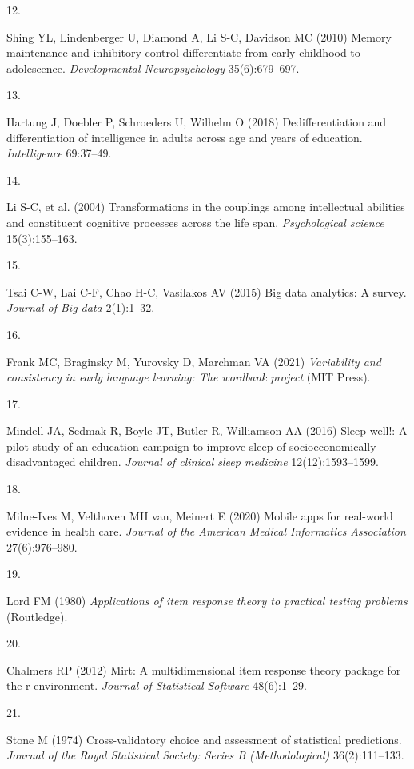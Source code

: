 \documentclass[man]{apa7}
\newlength{\csllabelwidth}
\newcommand{\CSLLeftMargin}[1]{\parbox[t]{\csllabelwidth}{#1}}
\begin{document}
\leavevmode\hypertarget{ref-shing2010memory}{}%
\CSLLeftMargin{12. }Shing YL, Lindenberger U, Diamond A, Li S-C, Davidson MC
(2010) Memory maintenance and inhibitory control differentiate from
early childhood to adolescence. \emph{Developmental Neuropsychology}
35(6):679--697.

\leavevmode\hypertarget{ref-hartung2018dedifferentiation}{}%
\CSLLeftMargin{13. }Hartung J, Doebler P, Schroeders U, Wilhelm O (2018)
Dedifferentiation and differentiation of intelligence in adults across
age and years of education. \emph{Intelligence} 69:37--49.

\leavevmode\hypertarget{ref-li2004transformations}{}%
\CSLLeftMargin{14. }Li S-C, et al. (2004) Transformations in the couplings
among intellectual abilities and constituent cognitive processes across
the life span. \emph{Psychological science} 15(3):155--163.

\leavevmode\hypertarget{ref-tsai2015big}{}%
\CSLLeftMargin{15. }Tsai C-W, Lai C-F, Chao H-C, Vasilakos AV (2015) Big
data analytics: A survey. \emph{Journal of Big data} 2(1):1--32.

\leavevmode\hypertarget{ref-frank2021variability}{}%
\CSLLeftMargin{16. }Frank MC, Braginsky M, Yurovsky D, Marchman VA (2021)
\emph{Variability and consistency in early language learning: The
wordbank project} (MIT Press).

\leavevmode\hypertarget{ref-mindell2016sleep}{}%
\CSLLeftMargin{17. }Mindell JA, Sedmak R, Boyle JT, Butler R, Williamson AA
(2016) Sleep well!: A pilot study of an education campaign to improve
sleep of socioeconomically disadvantaged children. \emph{Journal of
clinical sleep medicine} 12(12):1593--1599.

\leavevmode\hypertarget{ref-milne2020mobile}{}%
\CSLLeftMargin{18. }Milne-Ives M, Velthoven MH van, Meinert E (2020) Mobile
apps for real-world evidence in health care. \emph{Journal of the
American Medical Informatics Association} 27(6):976--980.

\leavevmode\hypertarget{ref-lord1980applications}{}%
\CSLLeftMargin{19. }Lord FM (1980) \emph{Applications of item response
theory to practical testing problems} (Routledge).

\leavevmode\hypertarget{ref-chalmers2012mirt}{}%
\CSLLeftMargin{20. }Chalmers RP (2012) Mirt: A multidimensional item
response theory package for the r environment. \emph{Journal of
Statistical Software} 48(6):1--29.

\leavevmode\hypertarget{ref-stone1974cross}{}%
\CSLLeftMargin{21. }Stone M (1974) Cross-validatory choice and assessment of
statistical predictions. \emph{Journal of the Royal Statistical Society:
Series B (Methodological)} 36(2):111--133.
\end{document}
